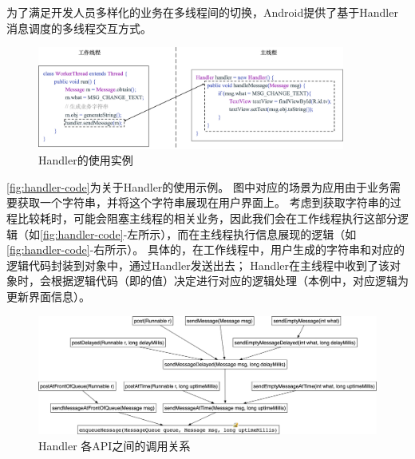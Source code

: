 为了满足开发人员多样化的业务在多线程间的切换，Android提供了基于Handler消息调度的多线程交互方式。



\begin{figure}[h]
	\centering
	\includegraphics[width=0.9\textwidth]{./Figures/handler-code.png}
	\caption{Handler的使用实例}
	\label{fig:handler-code}
\end{figure}


\autoref{fig:handler-code}为关于Handler的使用示例。
图中对应的场景为应用由于业务需要获取一个字符串，并将这个字符串展现在用户界面上。
考虑到获取字符串的过程比较耗时，可能会阻塞主线程的相关业务，因此我们会在工作线程执行这部分逻辑（如\autoref{fig:handler-code}-左所示），而在主线程执行信息展现的逻辑（如\autoref{fig:handler-code}-右所示）。
具体的，在工作线程中，用户生成的字符串和对应的逻辑代码封装到对象中，通过Handler发送出去；
Handler在主线程中收到了该对象时，会根据逻辑代码（即的值）决定进行对应的逻辑处理（本例中，对应逻辑为更新界面信息）。





\begin{figure}[hb]
	\centering
	\includegraphics[width=\textwidth]{./Figures/Handler-apis.png}
	\caption{ Handler 各API之间的调用关系}
	\label{fig:handler-apis}
\end{figure}


